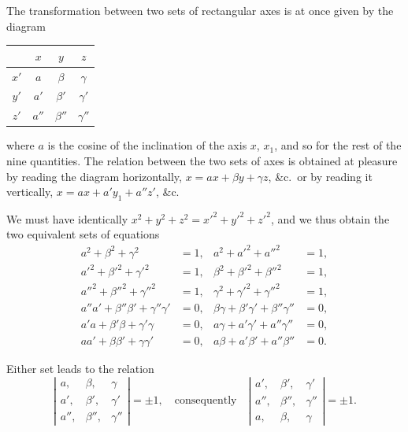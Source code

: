 \documentclass[11pt,a4paper]{article}
\theoremstyle{plain}
\theoremstyle{definition}
\begin{document}
The transformation between two sets of rectangular axes is at once given by the
diagram

\begin{center}
\begin{tabular}{c|ccc}
   & $x$ & $y$ & $z$ \\\hline
$x'$ & $a$ & $\beta$ & $\gamma$ \\
$y'$ & $a'$ & $\beta'$ & $\gamma'$ \\
$z'$ & $a''$ & $\beta''$ & $\gamma''$ \\
\end{tabular}
\end{center}

\noindent
where $a$ is the cosine of the inclination of the axis $x$, $x_1$, and so for the rest of the
nine quantities. The relation between the two sets of axes is obtained at pleasure by
reading the diagram horizontally, $x = ax + \beta y + \gamma z$, \&c.\ or by reading it vertically,
$x = ax + a'y_1 + a''z'$, \&c.

We must have identically $x^2 + y^2 + z^2 = x'^2 + y'^2 + z'^2$, and we thus obtain the two
equivalent sets of equations
\begin{align*}
a^2 + \beta^2 + \gamma^2 &= 1,& a^2 + a'^2 + a''^2 &= 1,\\
a'^2 + \beta'^2 + \gamma'^2 &= 1,& \beta^2 + \beta'^2 + \beta''^2 &= 1,\\
a''^2 + \beta''^2 + \gamma''^2 &= 1,& \gamma^2 + \gamma'^2 + \gamma''^2 &= 1,\\
a''a' + \beta''\beta' + \gamma''\gamma' &= 0,& \beta\gamma + \beta'\gamma' + \beta''\gamma'' &= 0,\\
a'a + \beta'\beta + \gamma'\gamma &= 0,& a\gamma + a'\gamma' + a''\gamma'' &= 0,\\
a a' + \beta\beta' + \gamma\gamma' &= 0,& a\beta + a'\beta' + a''\beta'' &= 0.
\end{align*}

Either set leads to the relation
\[
\left|\begin{array}{ccc}a,&\beta,&\gamma\\a',&\beta',&\gamma'\\a'',&\beta'',&\gamma''\end{array}\right|= \pm 1,\quad\text{consequently}\quad \left|\begin{array}{ccc}a',&\beta',&\gamma'\\a'',&\beta'',&\gamma''\\a,&\beta,&\gamma\end{array}\right| = \pm 1.
\]
\end{document}
